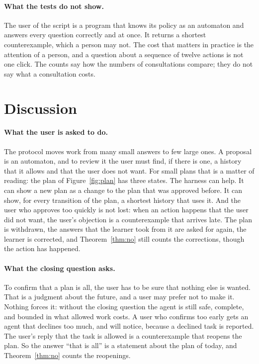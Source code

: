 \documentclass[acmsmall,nonacm,screen]{acmart}
\begin{document}
\paragraph{What the tests do not show.} The user of the script is a program that knows its
policy as an automaton and answers every question correctly and at once. It returns a
shortest counterexample, which a person may not. The cost that matters in practice is the
attention of a person, and a question about a sequence of twelve actions is not one click.
The counts say how the numbers of consultations compare; they do not say what a consultation
costs.

\section{Discussion}
\label{sec:discussion}

\paragraph{What the user is asked to do.} The protocol moves work from many small answers to
few large ones. A proposal is an automaton, and to review it the user must find, if there is
one, a history that it allows and that the user does not want. For small plans that is a
matter of reading: the plan of Figure~\ref{fig:plan} has three states. The harness can help.
It can show a new plan as a change to the plan that was approved before. It can show, for
every transition of the plan, a shortest history that uses it. And the user who approves too quickly is not lost: when an action
happens that the user did not want, the user's objection is a counterexample that arrives
late. The plan is withdrawn, the answers that the learner took from it are asked for again,
the learner is corrected, and Theorem~\ref{thm:no} still counts the corrections, though the
action has happened.

\paragraph{What the closing question asks.} To confirm that a plan is all, the user has to
be sure that nothing else is wanted. That is a judgment about the future, and a user may
prefer not to make it. Nothing forces it: without the closing question the agent is still
safe, complete, and bounded in what allowed work costs. A user who confirms too early gets
an agent that declines too much, and will notice, because a declined task is reported. The
user's reply that the task is allowed is a counterexample that reopens the plan. So the
answer ``that is all'' is a statement about the plan of today, and Theorem~\ref{thm:no}
counts the reopenings.
\end{document}
